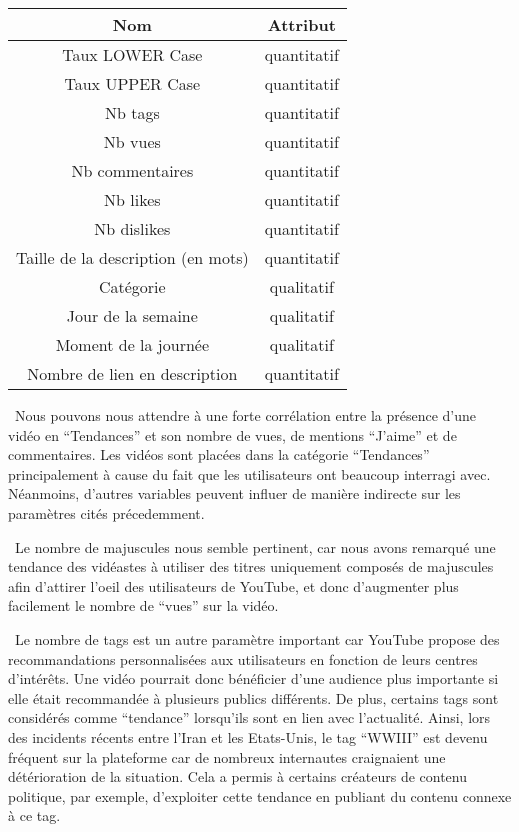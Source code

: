 \documentclass[
]{article}
\begin{document}
\begin{longtable}[]{@{}cc@{}}
\toprule
Nom & Attribut\tabularnewline
\midrule
\endhead
Taux LOWER Case & quantitatif\tabularnewline
Taux UPPER Case & quantitatif\tabularnewline
Nb tags & quantitatif\tabularnewline
Nb vues & quantitatif\tabularnewline
Nb commentaires & quantitatif\tabularnewline
Nb likes & quantitatif\tabularnewline
Nb dislikes & quantitatif\tabularnewline
Taille de la description (en mots) & quantitatif\tabularnewline
Catégorie & qualitatif\tabularnewline
Jour de la semaine & qualitatif\tabularnewline
Moment de la journée & qualitatif\tabularnewline
Nombre de lien en description & quantitatif\tabularnewline
\bottomrule
\end{longtable}

 Nous pouvons nous attendre à une forte corrélation entre la présence
d'une vidéo en ``Tendances'' et son nombre de vues, de mentions
``J'aime'' et de commentaires. Les vidéos sont placées dans la catégorie
``Tendances'' principalement à cause du fait que les utilisateurs ont
beaucoup interragi avec. Néanmoins, d'autres variables peuvent influer
de manière indirecte sur les paramètres cités précedemment.

 Le nombre de majuscules nous semble pertinent, car nous avons remarqué
une tendance des vidéastes à utiliser des titres uniquement composés de
majuscules afin d'attirer l'oeil des utilisateurs de YouTube, et donc
d'augmenter plus facilement le nombre de ``vues'' sur la vidéo.

 Le nombre de tags est un autre paramètre important car YouTube propose
des recommandations personnalisées aux utilisateurs en fonction de leurs
centres d'intérêts. Une vidéo pourrait donc bénéficier d'une audience
plus importante si elle était recommandée à plusieurs publics
différents. De plus, certains tags sont considérés comme ``tendance''
lorsqu'ils sont en lien avec l'actualité. Ainsi, lors des incidents
récents entre l'Iran et les Etats-Unis, le tag ``WWIII'' est devenu
fréquent sur la plateforme car de nombreux internautes craignaient une
détérioration de la situation. Cela a permis à certains créateurs de
contenu politique, par exemple, d'exploiter cette tendance en publiant
du contenu connexe à ce tag.
\end{document}
